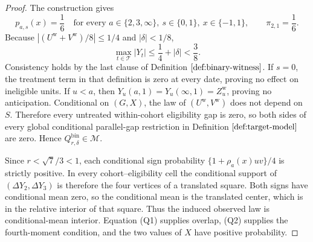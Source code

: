 \documentclass{article}
\begin{document}
\begin{proof}
The construction gives
\[
 p_{a,s}(x)=\frac16
 \quad\text{for every }a\in\{2,3,\infty\},\ s\in\{0,1\},\ x\in\{-1,1\},
 \qquad \pi_{2,1}=\frac16.
\tag{Q1}
\]
Because \(|(U^{\mathrm w}+V^{\mathrm w})/8|\le 1/4\) and \(|\delta|<1/8\),
\[
 \max_{t\in\mathcal T}|Y_t|
 \le \frac14+|\delta|<\frac38.
\tag{Q2}
\]
Consistency holds by the last clause of Definition \(\ref{def:binary-witness}\).  If \(s=0\), the treatment term in that definition is zero at every date, proving no effect on ineligible units.  If \(u<a\), then \(Y_u(a,1)=Y_u(\infty,1)=Z_u^{\mathrm w}\), proving no anticipation.  Conditional on \((G,X)\), the law of \((U^{\mathrm w},V^{\mathrm w})\) does not depend on \(S\).  Therefore every untreated within-cohort eligibility gap is zero, so both sides of every global conditional parallel-gap restriction in Definition \(\ref{def:target-model}\) are zero.  Hence \(Q^{\mathrm{bin}}_{r,\delta}\in\mathcal M\).

Since \(r<\sqrt7/3<1\), each conditional sign probability \(\{1+\rho_a(x)uv\}/4\) is strictly positive.  In every cohort--eligibility cell the conditional support of \((\Delta Y_2,\Delta Y_3)\) is therefore the four vertices of a translated square.  Both signs have conditional mean zero, so the conditional mean is the translated center, which is in the relative interior of that square.  Thus the induced observed law is conditional-mean interior.  Equation (Q1) supplies overlap, (Q2) supplies the fourth-moment condition, and the two values of \(X\) have positive probability.


\end{proof}
\end{document}
